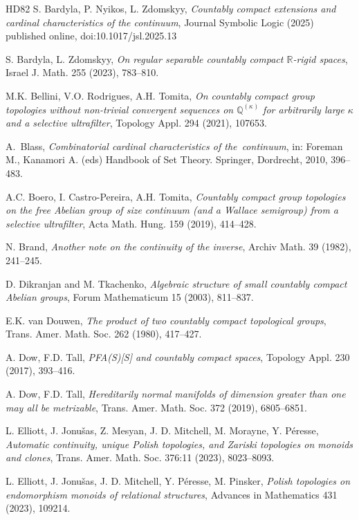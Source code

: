 \documentclass[12pt, twoside, leqno]{article}
\theoremstyle{definition}
\numberwithin{equation}{section}
\begin{document}
\begin{thebibliography}{HD82}
S. Bardyla, P. Nyikos, L. Zdomskyy, {\em Countably compact extensions and cardinal characteristics of the continuum}, Journal Symbolic Logic (2025) published online, doi:10.1017/jsl.2025.13

S. Bardyla, L. Zdomskyy,  {\em On regular separable countably compact $\mathbb R$-rigid spaces}, Israel J. Math. 255 (2023), 783--810.

M.K. Bellini, V.O. Rodrigues, A.H. Tomita,
{\em On countably compact group topologies without non-trivial convergent sequences on $\mathbb Q^{(\kappa)}$ for arbitrarily large $\kappa$ and a selective ultrafilter},
Topology Appl. 294 (2021), 107653.


A.~Blass, {\em Combinatorial cardinal characteristics of the~continuum}, 
    in: Foreman M., Kanamori A. (eds) Handbook of Set Theory. Springer, Dordrecht, 2010, 396--483.

A.C. Boero, I. Castro-Pereira, A.H. Tomita, {\em Countably compact group topologies on the free Abelian group of size continuum (and a Wallace semigroup) from a selective ultrafilter}, Acta Math. Hung. 159 (2019), 414--428.

    N. Brand, {\em Another note on the continuity of the inverse}, Archiv Math.
     39 (1982), 241--245.

D. Dikranjan and M. Tkachenko, {\em Algebraic structure of small countably compact
Abelian groups}, Forum Mathematicum 15 (2003), 811--837.

E.K. van Douwen, {\em The product of two countably compact topological groups}, Trans.
Amer. Math. Soc. 262 (1980), 417--427.

 A. Dow, F.D. Tall, {\em PFA(S)[S] and countably compact spaces}, Topology Appl. 230 (2017), 393--416.

 A. Dow, F.D. Tall, {\em Hereditarily normal manifolds of dimension greater than one may all be metrizable}, Trans. Amer. Math. Soc. 372 (2019), 6805--6851.


L. Elliott, J. Jonu\v{s}as, Z. Mesyan, J. D. Mitchell, M. Morayne, Y. P\'eresse,
{\em Automatic continuity, unique Polish topologies, and Zariski topologies on monoids and clones}, Trans. Amer. Math. Soc. 376:11 (2023), 8023--8093.


L. Elliott, J. Jonu\v{s}as, J. D. Mitchell, Y. P\'{e}resse, M. Pinsker, 
{\em Polish topologies on endomorphism monoids of relational structures}, Advances in Mathematics 431 (2023), 109214. 


\end{thebibliography}
\end{document}
